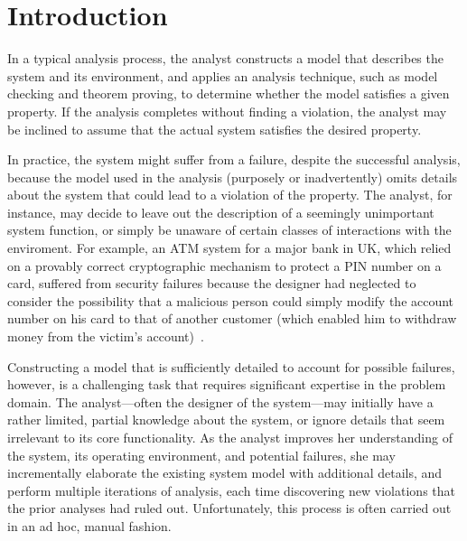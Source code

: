 
\section{Introduction}


In a typical analysis process, the analyst constructs a model that
describes the system and its environment, and applies an analysis
technique, such as model checking and theorem proving, to determine
whether the model satisfies a given property. If the analysis
completes without finding a violation, the analyst may be inclined to
assume that the actual system satisfies the desired property. 

In practice, the system might suffer from a failure, despite
the successful analysis, because the model used in the analysis
(purposely or inadvertently) omits details about the system that could
lead to a violation of the property. The analyst, for instance, may
decide to leave out the description of a seemingly unimportant system
function, or simply be unaware of certain classes of interactions with
the enviroment. For example, an ATM system for a major bank in UK,
which relied on a provably correct cryptographic mechanism to protect
a PIN number on a card, suffered from security failures because the
designer had neglected to consider the possibility that a malicious
person could simply modify the account number on his card to that
of another customer (which enabled him to withdraw money from the victim's
account)~\cite{anderson-needham}.

Constructing a model that is sufficiently detailed to account for
possible failures, however, is a challenging task that requires
significant expertise in the problem domain. The analyst---often the
designer of the system---may initially have a rather limited, partial
knowledge about the system, or ignore details that seem irrelevant
to its core functionality. As the analyst improves her understanding
of the system, its operating environment, and potential failures, she
may incrementally elaborate the existing system model with additional
details, and perform multiple iterations of analysis,
each time discovering new violations that the prior analyses had ruled
out. Unfortunately, this process is often carried out in an ad hoc,
manual fashion.

